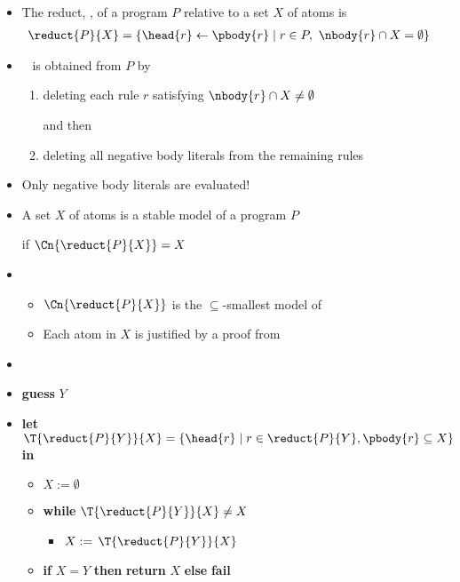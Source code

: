 \begin{frame}{}

  \begin{itemize}
  \item <2-11> The \alert{reduct}, , of a program $P$ relative to
    a set $X$ of atoms is
    \begin{align*}
      \reduct{P}{X} &= \{\head{r}\leftarrow\pbody{r} \mid r\in P,\ \nbody{r}\cap X=\emptyset\}
    \end{align*}

  \item<only@3-4>  \  is obtained from $P$ by
    \begin{enumerate}\normalsize
    \item deleting each rule $r$ satisfying $\nbody{r}\cap X\neq\emptyset$

      and then

    \item deleting all negative body literals from the remaining rules
    \end{enumerate}
  \item<only@4>[] Only negative body literals are evaluated!

  \item <only@7-11> A set $X$ of atoms is a \alert{stable model} of a program $P$

    if $\Cn{\reduct{P}{X}}=X$

    \smallskip

  \item<only@8> 
    \begin{itemize}\normalsize
    \item $\Cn{\reduct{P}{X}}$ is the $\subseteq$-smallest model of 
      \smallskip
    \item Each atom in $X$ is justified by a proof from 
    \end{itemize}

  \item<only@9-10> 

  \item<only@10> []\small \textbf{guess} $Y$
  \item<only@10> []\small \textbf{let} $\T{\reduct{P}{Y}}{X}=\{\head{r}\mid r\in \reduct{P}{Y}, \pbody{r}\subseteq X\}$ \textbf{in}
    \begin{itemize}
    \item []$X := \emptyset$
      \smallskip
    \item []\textbf{while} {$\T{\reduct{P}{Y}}{X}\neq X$}
      \begin{itemize}\small
      \item[] $X := {\,\T{\reduct{P}{Y}}{X}}$
      \end{itemize}
    \item[]\small \textbf{if} $X=Y$ \textbf{then} \textbf{return} $X$ \textbf{else} \textbf{fail}
    \end{itemize}


\end{itemize}
\end{frame}
